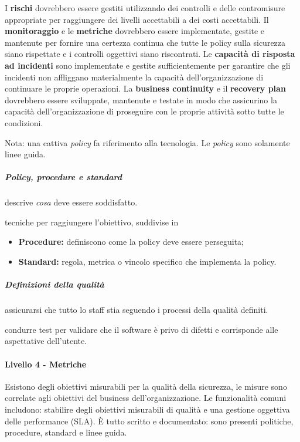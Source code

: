 I \textbf{rischi} dovrebbero essere gestiti utilizzando dei controlli e delle 
contromisure appropriate per raggiungere dei livelli accettabili a dei costi 
accettabili. Il \textbf{monitoraggio} e le \textbf{metriche} dovrebbero essere 
implementate, gestite e mantenute per fornire una certezza continua che tutte 
le policy sulla sicurezza siano rispettate e i controlli oggettivi siano 
riscontrati. Le \textbf{capacità di risposta ad incidenti} sono implementate e 
gestite sufficientemente per garantire che gli incidenti non affliggano materialmente 
la capacità dell'organizzazione di continuare le proprie operazioni. 
La \textbf{business continuity} e il \textbf{recovery plan} dovrebbero essere 
sviluppate, mantenute e testate in modo che assicurino la capacità dell'organizzazione 
di proseguire con le proprie attività sotto tutte le condizioni.

Nota: una cattiva \textit{policy} fa riferimento alla tecnologia. Le 
\textit{policy} sono solamente linee guida.

\subparagraph{Policy, procedure e standard}

 descrive \textit{cosa} deve essere soddisfatto.

 tecniche per raggiungere l'obiettivo, suddivise in
\begin{itemize}
\item \textbf{Procedure:} definiscono come la policy deve essere perseguita;
\item \textbf{Standard:} regola, metrica o vincolo specifico che implementa la policy.
\end{itemize}

\subparagraph{Definizioni della qualità}

 assicurarsi che tutto lo staff stia seguendo i 
processi della qualità definiti.

 condurre test per validare che il software è 
privo di difetti e corrisponde alle aspettative dell'utente.

\paragraph{Livello 4 - Metriche}

Esistono degli obiettivi misurabili per la qualità della sicurezza, le misure 
sono correlate agli obiettivi del business dell'organizzazione. Le funzionalità 
comuni includono: stabilire degli obiettivi misurabili di qualità e una gestione
oggettiva delle performance (SLA).
È tutto scritto e documentato: sono presenti politiche, 
procedure, standard e linee guida.

